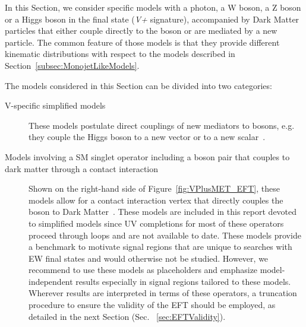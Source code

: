 
In this Section, we consider specific models with a photon, a W boson, a Z boson or a Higgs boson in the final state (\textit{V+\MET} signature), accompanied by Dark Matter particles that either couple directly to the boson or are mediated by a new particle. The common feature of those models is that they provide different kinematic distributions with respect to the models described in Section~\ref{subsec:MonojetLikeModels}.


The models considered in this Section can be divided into two categories:
\begin{description}
 \item[V-specific simplified models] These models postulate direct couplings of new mediators
 to bosons, e.g. they couple the Higgs boson to a new vector or to a new scalar~\cite{Carpenter:2013xra,Berlin:2014cfa}. 
 \item[Models involving a SM singlet operator including a boson pair that couples to dark matter through a contact interaction]
 Shown on the right-hand side of Figure~\ref{fig:VPlusMET_EFT},
 these models allow for a contact interaction vertex that directly couples the boson to Dark Matter~\cite{Cotta:2012nj, Carpenter:2012rg, Crivellin:2015wva,Berlin:2014cfa}.
 These models are included in this report devoted to simplified models since 
 UV completions for most of these operators proceed through loops and are not available to date. 
 These models provide a benchmark to motivate signal regions that are unique to searches with
 EW final states and would otherwise not be studied. However, we recommend to use these models
 as placeholders and emphasize model-independent results especially in signal regions tailored to these models. 
 Wherever results are interpreted in terms of these operators, a truncation procedure
 to ensure the validity of the EFT should be employed, as detailed in the next Section (Sec. ~\ref{sec:EFTValidity}). 
\end{description}

